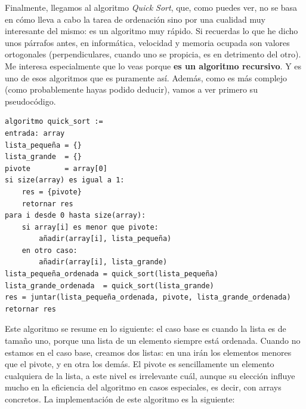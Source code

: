 \documentclass[a4paper]{article}
\begin{document}
Finalmente, llegamos al algoritmo \textit{Quick Sort}, que, como puedes ver,
no se basa en cómo lleva a cabo la tarea de ordenación sino por una cualidad
muy interesante del mismo: es un algoritmo muy rápido. Si recuerdas lo que he
dicho unos párrafos antes, en informática, velocidad y memoria ocupada son
valores ortogonales (perpendiculares, cuando uno se propicia, es en detrimento
del otro). Me interesa especialmente que lo veas porque \textbf{es un algoritmo
recursivo}. Y es uno de esos algoritmos que es puramente así.
Además, como es más complejo (como probablemente hayas podido deducir), vamos a
ver primero su pseudocódigo.


\noindent
\begin{minipage}[H]{\linewidth}
\begin{lstlisting}[style=pseudoCode]
algoritmo quick_sort :=
entrada: array
lista_pequeña = {}
lista_grande  = {}
pivote        = array[0]
si size(array) es igual a 1:
    res = {pivote}
    retornar res
para i desde 0 hasta size(array):
    si array[i] es menor que pivote:
        añadir(array[i], lista_pequeña)
    en otro caso:
        añadir(array[i], lista_grande)
lista_pequeña_ordenada = quick_sort(lista_pequeña)
lista_grande_ordenada  = quick_sort(lista_grande)
res = juntar(lista_pequeña_ordenada, pivote, lista_grande_ordenada)
retornar res
\end{lstlisting}
\end{minipage}

Este algoritmo se resume en lo siguiente: el caso base es cuando la lista
es de tamaño uno, porque una lista de un elemento siempre está ordenada.
Cuando no estamos en el caso base, creamos dos listas: en una irán los elementos
menores que el pivote, y en otra los demás. El pivote es sencillamente un
elemento cualquiera de la lista, a este nivel es irrelevante cuál, aunque
su elección influye mucho en la eficiencia del algoritmo en casos especiales,
es decir, con arrays concretos.
La implementación de este algoritmo es la siguiente:
\end{document}
